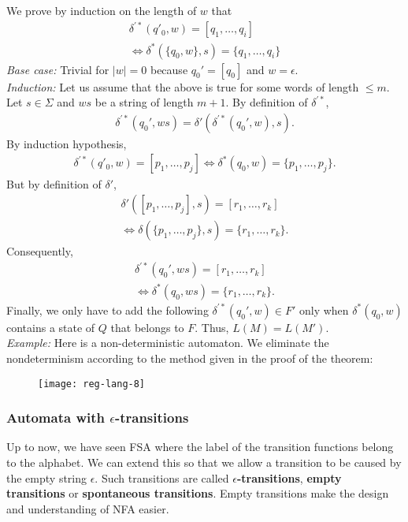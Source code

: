 We prove by induction on the length of $w$ that
\begin{align*}
  \delta^{\prime *}(q'_0, w) = [q_1,\dots,q_i] \\ \Longleftrightarrow \delta^{*}(\{q_0, w\}, s) = \{q_1,\dots,q_i\}
\end{align*}
\textit{Base case:} Trivial for $\lvert w \rvert = 0$ because
$q_0' = [q_0]$ and $w = \epsilon$.\\
\textit{Induction:} Let us assume that the above is true for some words of length $\leq m$.
Let $s \in \Sigma$ and $ws$ be a string of length $m+1$.
By definition of $\delta^{\prime *}$,
\begin{align*}
  \delta^{\prime *}(q_0', ws) = \delta'(\delta^{\prime *}(q_0', w), s).
\end{align*}
By induction hypothesis,
\begin{align*}
  \delta^{\prime *}(q'_0, w) = [p_1,\dots,p_j] \Longleftrightarrow \delta^{*}(q_0, w) = \{p_1,\dots,p_j\}.
\end{align*}
But by definition of $\delta'$,
\begin{align*}
  \delta'([p_1, \dots, p_j], s) = [r_1, \dots, r_k] \\ \Longleftrightarrow \delta (\{p_1, \dots, p_j\}, s) = \{r_1, \dots, r_k\}.
\end{align*}
Consequently, 
\begin{align*}
  \delta^{\prime *} (q_0', ws) = [r_1, \dots, r_k] \\ \Longleftrightarrow \delta^{*}(q_0, ws) = \{r_1, \dots, r_k\}.
\end{align*}
Finally, we only have to add the following $\delta^{\prime * }(q_0', w) \in F'$ only when
$\delta^{*}(q_0, w)$ contains a state of $Q$ that belongs to $F$. Thus,
$L(M) = L(M')$.\\

\textit{Example:} Here is a non-deterministic automaton. We eliminate the nondeterminism according to the method given in the proof of the theorem:
\begin{figure}[H]
  \centering
  \texttt{[image: reg-lang-8]}
\end{figure}
\subsubsection{Automata with $\epsilon$-transitions}
Up to now, we have seen FSA where the label of the 
transition functions belong to the alphabet.
We can extend this so that we allow a transition to be caused 
by the empty string $\epsilon$.
Such transitions are called \textbf{$\epsilon$-transitions}, \textbf{empty transitions} or \textbf{spontaneous transitions}.
Empty transitions make the design and understanding of NFA easier.\\

